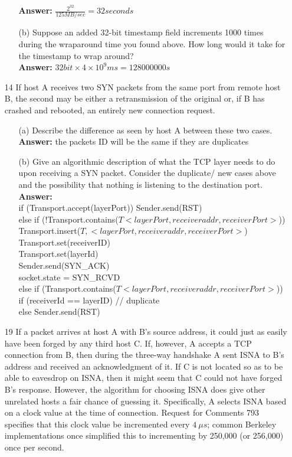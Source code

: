 \documentclass[a4paper]{article}
\newcommand\tab[1][0.5cm]{\hspace*{#1}}
\begin{document}
\begin{itemize}
\begin{itemize}
	      	      \textbf{Answer:} $\frac{2^32}{125MB/sec} = 32 seconds$
	      	\item[(b)] Suppose an added 32-bit timestamp field increments 1000 times during the wraparound time you found above. How long would it take for the timestamp to wrap around? \\
	      	      \textbf{Answer:} $32 bit \times 4 \times 10^9 ms = 128000000s$
	      \end{itemize}
	\item[14] If host A receives two SYN packets from the same port from remote host B, the second may be either a retransmission of the original or, if B has crashed and rebooted, an entirely new connection request.
	      \begin{itemize}
	      	\item[(a)] Describe the difference as seen by host A between these two cases. \\
	      	      \textbf{Answer:} the packets ID will be the same if they are duplicates
	      	\item[(b)] Give an algorithmic description of what the TCP layer needs to do upon receiving a SYN packet. Consider the duplicate/ new cases above and the possibility that nothing is listening to the destination port. \\
					\textbf{Answer:} \\
					if (Transport.accept(layerPort)) Sender.send(RST) \\
					else if (!Transport.contains($T<layerPort, receiveraddr, receiverPort>$)) \\
					\tab Transport.insert($T,<layerPort, receiveraddr, receiverPort>$) \\
					\tab Transport.set(receiverID) \\
					\tab Transport.set(layerId) \\
					\tab Sender.send(SYN\_ACK) \\
					\tab socket.state = SYN\_RCVD \\
					else if (Transport.contains($T<layerPort, receiveraddr, receiverPort>$)) \\
					\tab if (receiverId == layerID) // duplicate \\
					\tab else Sender.send(RST)
	      \end{itemize}
	\item[19] If a packet arrives at host A with B’s source address, it could just as easily have been forged by any third host C. If, however, A accepts a TCP connection from B, then during the three-way handshake A sent ISNA to B’s address and received an acknowledgment of it. If C is not located so as to be able to eavesdrop on ISNA, then it might seem that C could not have forged B’s response. However, the algorithm for choosing ISNA does give other unrelated hosts a fair chance of guessing it. Specifically, A selects ISNA based on a clock value at the time of connection. Request for Comments 793 specifies that this clock value be incremented every $\SI{4}{\mu}s$; common Berkeley implementations once simplified this to incrementing by 250,000 (or 256,000) once per second.

\end{itemize}
\end{document}
